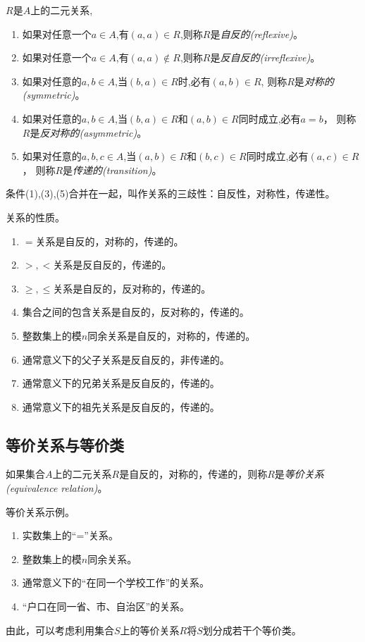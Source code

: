 \begin{definition}
	$R$是$A$上的二元关系,
	\begin{enumerate}
		\item 如果对任意一个$a\in A$,有$(a,a)\in R$,则称$R$是\emph{自反的(reflexive)}。
		\item 如果对任意一个$a\in A$,有$(a,a)\notin R$,则称$R$是\emph{反自反的(irreflexive)}。
		\item 如果对任意的$a,b\in A$,当$(b,a)\in R$时,必有$(a,b)\in R$,
		则称$R$是\emph{对称的(symmetric)}。
		\item 如果对任意的$a,b\in A$,当$(b,a)\in R$和$(a,b)\in R$同时成立,必有$a=b$，
		则称$R$是\emph{反对称的(asymmetric)}。
		\item 如果对任意的$a,b,c\in A$,当$(a,b)\in R$和$(b,c)\in R$同时成立,必有$(a,c)\in R$，
		则称$R$是\emph{传递的(transition)}。
	\end{enumerate}
    条件(1),(3),(5)合并在一起，叫作关系的三歧性：自反性，对称性，传递性。
\end{definition}

\begin{example}
	关系的性质。
	\begin{enumerate}
		\item $=$关系是自反的，对称的，传递的。
		\item $>,<$关系是反自反的，传递的。
		\item $\ge,\le$关系是自反的，反对称的，传递的。
		\item 集合之间的包含关系是自反的，反对称的，传递的。
		\item 整数集上的模$n$同余关系是自反的，对称的，传递的。
		\item 通常意义下的父子关系是反自反的，非传递的。
		\item 通常意义下的兄弟关系是反自反的，传递的。
		\item 通常意义下的祖先关系是反自反的，传递的。
	\end{enumerate}
\end{example}

\subsection{等价关系与等价类}

\begin{definition}
	如果集合$A$上的二元关系$R$是自反的，对称的，传递的，则称$R$是\emph{等价关系(equivalence relation)}。
\end{definition}

\begin{example}
	等价关系示例。
	\begin{enumerate}
		\item 实数集上的“=”关系。
		\item 整数集上的模$n$同余关系。
		\item 通常意义下的“在同一个学校工作”的关系。
		\item “户口在同一省、市、自治区”的关系。
	\end{enumerate}
    由此，可以考虑利用集合$S$上的等价关系$R$将$S$划分成若干个等价类。
\end{example}

